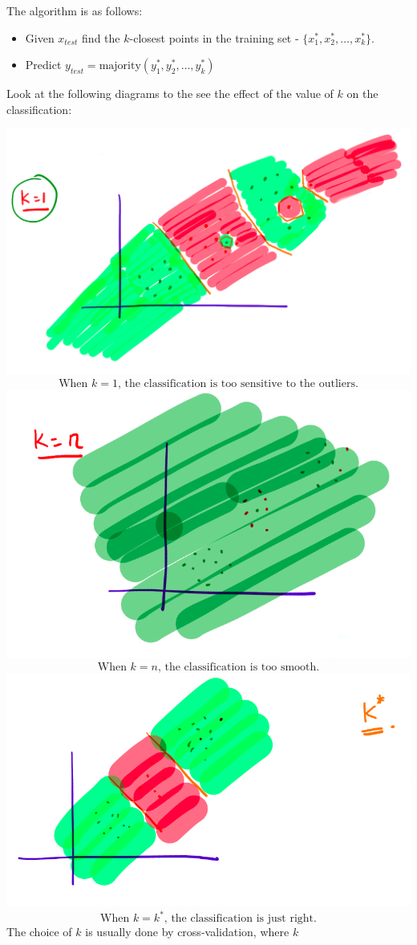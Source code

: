 \documentclass[
]{article}
\providecommand{\tightlist}{%
  \setlength{\itemsep}{0pt}\setlength{\parskip}{0pt}}
\begin{document}
The algorithm is as follows:

\begin{itemize}
\tightlist
\item
  Given \(x_{test}\) find the \(k\)-closest points in the training set -
  \(\{x_1^*, x_2^*, \ldots, x_k^*\}\).
\item
  Predict \(y_{test} = \text{majority}(y_1^*, y_2^*, \ldots, y_k^*)\)
\end{itemize}

Look at the following diagrams to the see the effect of the value of
\(k\) on the classification:

\includegraphics{../images/k1.png} \[
\text{When }k=1\text{, the classification is too sensitive to the outliers.}
\] \includegraphics{../images/kn.png} \[
\text{When }k=n\text{, the classification is too smooth.}
\] \includegraphics{../images/k*.png} \[
\text{When }k=k^*\text{, the classification is just right.}
\] The choice of \(k\) is usually done by cross-validation, where \(k\)
\end{document}
